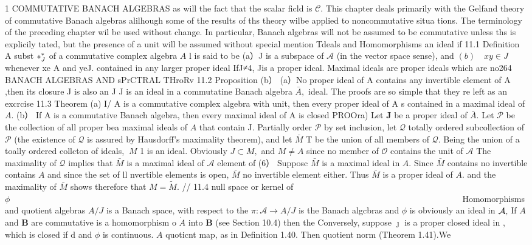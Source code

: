 1 COMMUTATIVE BANACH ALGEBRAS as will the fact that the scalar ficld is ${\mathcal{C}}.$ This chapter deals primarily with the Gelfand theory of commutative Banach algebras alilhough some of the results of ths theory wilbe applied to noncommutative situa tions. The terminology of the preceding chapter wil be used without change. In particular, Banach algebras will not be assumed to be commutative unless ths is explicily tated, but the presence of a unit will be assumed without special mention Tdeals and Homomorphisms an ideal if 11.1 Definition A subst $\*{*}_{J}^{*}$ of a commutative complex algebra $\scriptstyle A$ l is said to be (a）J is a subspace of $\textstyle{\mathcal{A}}$ (in the vector space sense), and $(b)\quad x y\in J$ whenever xe A and yeJ. contained in any larger proper ideal IfJ≠4, Jis a proper idcal. Maximal ideals are proper ideals which are no264 BANACH ALGEBRAS AND sPrCTRAL THroRv 11.2 Proposition (b） (a）No proper ideal of A contains any invertible element of A ,then its closure J is also an J J is an ideal in a commutatine Banach algebra ${\bar{A}},$ ideal. The proofs are so simple that they re left as an excrcise 11.3 Theorem (a) I/ A is a commutative complex algebra with unit, then every proper ideal of A s contained in a maximal ideal of $A.$ (b） If A is a commutative Banach algebra, then every maximal ideal of A is closed PROOra) Let $\boldsymbol{J}$ be a proper ideal of ${\bar{A}}.$ Let ${\mathcal{P}}$ be the collection of all proper bea maximal ideals of $\textstyle{A}$ that contain J. Partially order ${\mathcal{P}}$ by set inclusion, let $\textstyle{\mathcal{Q}}$ totally ordered subcollection of ${\mathcal{P}}$ (the existence of ${\mathcal{Q}}$ is assured by Hausdorff's maximality theorem), and let $\bar{M}$ T be the union of all members of ${\mathcal{Q}}.$ Being the union of a toally ordered collcton of idcals, $\ M$ 1 is an ideal. Obviously $J\subset M,$ and $M\neq A$ since no member of ${\mathcal{O}}$ contains the unit of $\textstyle{\mathcal{A}}$ The maximality of $\mathcal{Q}$ implies that $\bar{M}$ is a maximal ideal of $\textstyle{\mathcal{A}}$ element of (6） Supposc $\bar{M}$ is a maximal ideal in $A.$ Since $\bar{M}$ contains no invertible contains $\textstyle A$ and since the set of ll nvertible elements is open, $\overline{{M}}$ no invertible element either. Thus $\overline{{M}}$ is a proper ideal of $A.$ and the maximality of $\bar{M}$ shows therefore that $M={\widetilde{M}}.$ // 11.4 null space or kernel of $\phi~~~~~~~~~~~~~~~~~~~~~~~~~~~~~~~~~~~~~~~~~~~~~~~~~~~~~~~~~~~~~~~~~~~~~~~~~~~~~~~~~~~~~~~~~~~~~~~~~~~~~~~~~~~~~~~~~~~~~~~~~~~~~~~~~~~~~~~~~~~~~~~~~~~~~~~~~~~~~~~~~~~~~~~~~~~~~~~~~~~~~~~~~~~~~~~~~~~~~~~~~~~~~~~~~~~~~~~~~~~~~~~~~~~~~~~~~~~~~~~$ Homomorphisms and quotient algebras $A/J$ is a Banach space, with respect to the $\pi\colon{\mathcal{A}}\to A/J$ is the Banach algcbras and $\phi$ is obviously an ideal in ${\cal A},$ If $\textstyle A$ and ${\boldsymbol{B}}$ are commutative is a homomorphism o $\dot{A}$ into $\boldsymbol{B}$ (see Section 10.4) then the Conversely, suppose $\boldsymbol{\jmath}$ is a proper closed ideal in , which is closed if d and $\phi$ is continuous. $\scriptstyle A$ quoticnt map, as in Definition 1.40. Then quotient norm (Theorem 1.41).We 